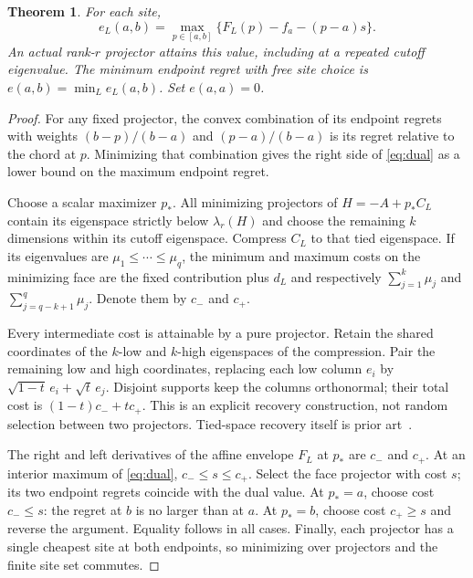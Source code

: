 \documentclass[11pt]{article}
\newtheorem{theorem}{Theorem}
\begin{document}
\begin{theorem}\label{thm:endpoint}
For each site,
\begin{equation}
 e_L(a,b)=\max_{p\in[a,b]}
 \{F_L(p)-f_a-(p-a)s\}.                                     \label{eq:dual}
\end{equation}
An actual rank-$r$ projector attains this value, including at a repeated
cutoff eigenvalue. The minimum endpoint regret with free site choice is
$e(a,b)=\min_L e_L(a,b)$. Set $e(a,a)=0$.
\end{theorem}
\begin{proof}
For any fixed projector, the convex combination of its endpoint regrets
with weights $(b-p)/(b-a)$ and $(p-a)/(b-a)$ is its regret relative to
the chord at $p$. Minimizing that combination gives the right side of
\eqref{eq:dual} as a lower bound on the maximum endpoint regret.

Choose a scalar maximizer $p_*$. All minimizing projectors of
$H=-A+p_*C_L$ contain its eigenspace strictly below $\lambda_r(H)$
and choose the remaining $k$ dimensions within its cutoff eigenspace.
Compress $C_L$ to that tied eigenspace. If its eigenvalues are
$\mu_1\le\cdots\le\mu_q$, the minimum and maximum costs on the
minimizing face are the fixed contribution plus $d_L$ and respectively
$\sum_{j=1}^k\mu_j$ and $\sum_{j=q-k+1}^q\mu_j$. Denote them by
$c_-$ and $c_+$.

Every intermediate cost is attainable by a pure projector. Retain the
shared coordinates of the $k$-low and $k$-high eigenspaces of the compression.
Pair the remaining low and high coordinates, replacing each low column
$e_i$ by $\sqrt{1-t}\,e_i+\sqrt{t}\,e_j$. Disjoint supports keep the
columns orthonormal; their total cost is $(1-t)c_-+tc_+$.
This is an explicit recovery construction, not random selection between
two projectors. Tied-space recovery itself is prior art~\cite{shen2026}.

The right and left derivatives of the affine envelope $F_L$ at $p_*$ are
$c_-$ and $c_+$. At an interior maximum of \eqref{eq:dual},
$c_-\le s\le c_+$. Select the face projector with cost $s$; its two
endpoint regrets coincide with the dual value. At $p_*=a$, choose cost
$c_-\le s$: the regret at $b$ is no larger than at $a$. At $p_*=b$,
choose cost $c_+\ge s$ and reverse the argument. Equality follows in
all cases. Finally, each projector has a single cheapest site at both
endpoints, so minimizing over projectors and the finite site set commutes.
\end{proof}
\end{document}
